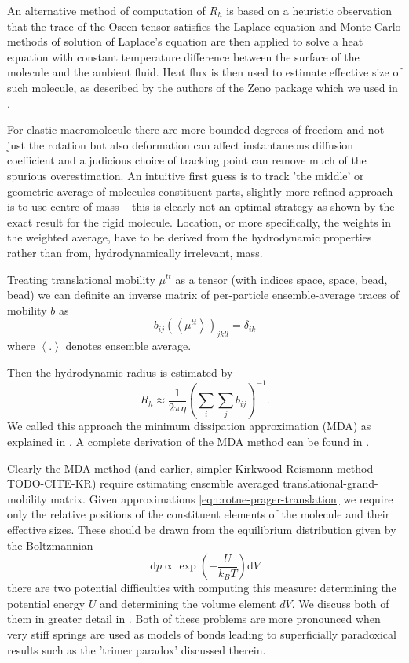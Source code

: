 \documentclass{doctoral}
\newcommand{\dd}{\mathrm{d}}
\begin{document}
An alternative method of computation of $R_h$ is based on a heuristic observation that the trace of the Oseen tensor satisfies the Laplace equation and Monte Carlo methods of solution of Laplace's equation are then applied to solve a heat equation with constant temperature difference between the surface of the molecule and the ambient fluid.
Heat flux is then used to estimate effective size of such molecule, as described by the authors of the Zeno package \cite{Juba_2017} which we used in \textcite{Waszkiewicz_2023_dna}.

For elastic macromolecule there are more bounded degrees of freedom and not just the rotation but also deformation can affect instantaneous diffusion coefficient and a judicious choice of tracking point can remove much of the spurious overestimation.
An intuitive first guess is to track 'the middle' or geometric average of molecules constituent parts, slightly more refined approach is to use centre of mass -- this is clearly not an optimal strategy as shown by the exact result for the rigid molecule.
Location, or more specifically, the weights in the weighted average, have to be derived from the hydrodynamic properties rather than from, hydrodynamically irrelevant, mass.

Treating translational mobility $\mu^{tt}$ as a tensor (with indices space, space, bead, bead) we can definite an inverse matrix of per-particle ensemble-average traces of mobility $b$ as
\begin{equation}
    b_{ij} (\left< \mu^{tt} \right> )_{jkll} = \delta_{ik}
\end{equation}
where $\left< .
    \right>$ denotes ensemble average.

Then the hydrodynamic radius is estimated by
\begin{equation}
    R_h \approx \frac{1}{2 \pi \eta} \left( \sum_i \sum_j b_{ij} \right)^{-1}.
\end{equation}
We called this approach the minimum dissipation approximation (MDA) as explained in \textcite{Waszkiewicz_2024_mda}.
A complete derivation of the MDA method can be found in \textcite{Cichocki_2019}.

Clearly the MDA method (and earlier, simpler Kirkwood-Reismann method TODO-CITE-KR) require estimating ensemble averaged translational-grand-mobility matrix.
Given approximations \eqref{eqn:rotne-prager-translation} we require only the relative positions of the constituent elements of the molecule and their effective sizes.
These should be drawn from the equilibrium distribution given by the Boltzmannian
\begin{equation}
    \dd p \propto \exp \left(- \frac{U}{k_B T} \right) \dd V
\end{equation}
there are two potential difficulties with computing this measure: determining the potential energy $U$ and determining the volume element $dV$.
We discuss both of them in greater detail in \textcite{Waszkiewicz_2024_trimer}.
Both of these problems are more pronounced when very stiff springs are used as models of bonds leading to superficially paradoxical results such as the 'trimer paradox' discussed therein.
\end{document}
